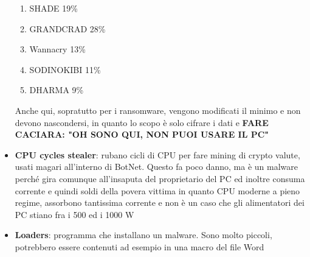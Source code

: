 \documentclass[12pt, oneside]{extbook}
\begin{document}
\begin{itemize}
\begin{enumerate}
\item SHADE 19\%
\item GRANDCRAD 28\%
\item Wannacry 13\%
\item SODINOKIBI 11\%
\item DHARMA 9\%
\end{enumerate}
Anche qui, sopratutto per i ransomware, vengono modificati il minimo e non devono nascondersi, in quanto lo scopo è solo cifrare i dati e \textbf{\textsf{FARE CACIARA: "OH SONO QUI, NON PUOI USARE IL PC"}}
\item \textbf{CPU cycles stealer}: rubano cicli di CPU per fare mining di crypto valute, usati magari all'interno di BotNet. Questo fa poco danno, ma è un malware perché gira comunque all'insaputa del proprietario del PC ed inoltre consuma corrente e quindi soldi della povera vittima in quanto CPU moderne a pieno regime, assorbono tantissima corrente e non è un caso che gli alimentatori dei PC stiano fra i 500 ed i 1000 W
\item \textbf{Loaders}: programma che installano un malware. Sono molto piccoli, potrebbero essere contenuti ad esempio in una macro del file Word
\end{itemize}
\end{document}
